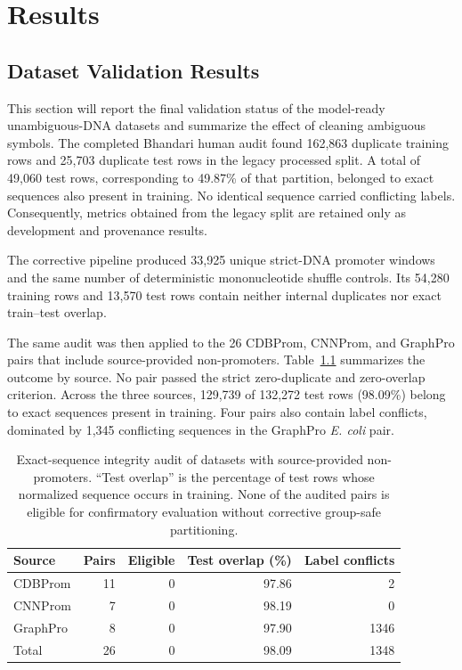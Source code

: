\chapter{Results}\label{chap:results}

\section{Dataset Validation Results}\label{sec:results-validation}

This section will report the final validation status of the model-ready
unambiguous-DNA datasets and summarize the effect of cleaning ambiguous symbols.
The completed Bhandari human audit found 162,863 duplicate training rows and
25,703 duplicate test rows in the legacy processed split. A total of 49,060 test
rows, corresponding to 49.87\% of that partition, belonged to exact sequences
also present in training. No identical sequence carried conflicting labels.
Consequently, metrics obtained from the legacy split are retained only as
development and provenance results.

The corrective pipeline produced 33,925 unique strict-DNA promoter windows and
the same number of deterministic mononucleotide shuffle controls. Its 54,280
training rows and 13,570 test rows contain neither internal duplicates nor exact
train--test overlap.

The same audit was then applied to the 26 CDBProm, CNNProm, and GraphPro pairs
that include source-provided non-promoters. Table~\ref{tab:results-real-negative-integrity}
summarizes the outcome by source. No pair passed the strict zero-duplicate and
zero-overlap criterion. Across the three sources, 129,739 of 132,272 test rows
(98.09\%) belong to exact sequences present in training. Four pairs also contain
label conflicts, dominated by 1,345 conflicting sequences in the GraphPro
\textit{E. coli} pair.

\begin{table}[htbp]
  \centering
  \caption{Exact-sequence integrity audit of datasets with source-provided non-promoters. ``Test overlap'' is the percentage of test rows whose normalized sequence occurs in training. None of the audited pairs is eligible for confirmatory evaluation without corrective group-safe partitioning.}
  \label{tab:results-real-negative-integrity}
  \begin{tabular}{lrrrr}
    \toprule
    Source & Pairs & Eligible & Test overlap (\%) & Label conflicts \\
    \midrule
    CDBProm & 11 & 0 & 97.86 & 2 \\
    CNNProm & 7 & 0 & 98.19 & 0 \\
    GraphPro & 8 & 0 & 97.90 & 1346 \\
    \midrule
    Total & 26 & 0 & 98.09 & 1348 \\
    \bottomrule
  \end{tabular}
\end{table}

